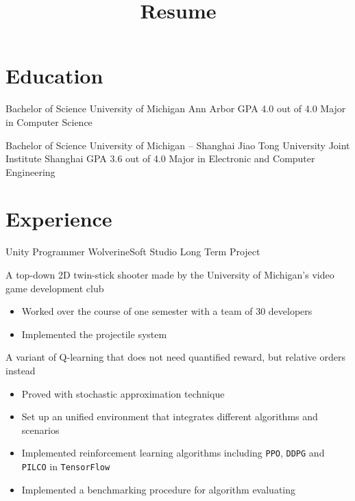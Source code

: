 \documentclass[10pt, a4paper, sans]{moderncv}
\title{Resume}
\begin{document}
\makecvtitle
	
\section{Education}
{Bachelor of Science}
{University of Michigan}
{Ann Arbor}
{GPA 4.0 out of 4.0}
{Major in Computer Science \\
}

{Bachelor of Science}
{University of Michigan -- Shanghai Jiao Tong University Joint Institute}
{Shanghai}
{GPA 3.6 out of 4.0}
{Major in Electronic and Computer Engineering \\
}

\section{Experience}
{Unity Programmer}
{WolverineSoft Studio Long Term Project}
{}{}
{A top-down 2D twin-stick shooter made by the University of Michigan's video game development club
\begin{itemize}
\item Worked over the course of one semester with a team of 30 developers
\item Implemented the projectile system
\end{itemize}}

{
A variant of Q-learning that does not need quantified reward, but relative orders instead
\begin{itemize}
\item Proved with stochastic approximation technique
\end{itemize}}
{
\begin{itemize}
\item Set up an unified environment that integrates different algorithms and scenarios
\item Implemented reinforcement learning algorithms including \texttt{PPO}, \texttt{DDPG} and \texttt{PILCO} in \texttt{TensorFlow}
\item Implemented a benchmarking procedure for algorithm evaluating
\end{itemize}
}
\end{document}
